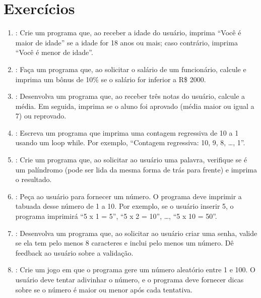\documentclass[letterpaper,10pt,english]{jupyterBook}
\begin{document}
\section{Exercícios}
\label{\detokenize{chapters/ch4/ch4:exercicios}}\begin{enumerate}
%
\item {} 
\sphinxAtStartPar
{}:
Crie um programa que, ao receber a idade do usuário, imprima “Você é maior de idade” se a idade for 18 anos ou mais; caso contrário, imprima “Você é menor de idade”.

\item {} 
\sphinxAtStartPar
{}:
Faça um programa que, ao solicitar o salário de um funcionário, calcule e imprima um bônus de 10\% se o salário for inferior a R\$ 2000.

\item {} 
\sphinxAtStartPar
{}:
Desenvolva um programa que, ao receber três notas do usuário, calcule a média. Em seguida, imprima se o aluno foi aprovado (média maior ou igual a 7) ou reprovado.

\item {} 
\sphinxAtStartPar
{}:
Escreva um programa que imprima uma contagem regressiva de 10 a 1 usando um loop while. Por exemplo, “Contagem regressiva: 10, 9, 8, …, 1”.

\item {} 
\sphinxAtStartPar
{}:
Crie um programa que, ao solicitar ao usuário uma palavra, verifique se é um palíndromo (pode ser lida da mesma forma de trás para frente) e imprima o resultado.

\item {} 
\sphinxAtStartPar
{}:
Peça ao usuário para fornecer um número. O programa deve imprimir a tabuada desse número de 1 a 10. Por exemplo, se o usuário inserir 5, o programa imprimirá “5 x 1 = 5”, “5 x 2 = 10”, …, “5 x 10 = 50”.

\item {} 
\sphinxAtStartPar
{}:
Desenvolva um programa que, ao solicitar ao usuário criar uma senha, valide se ela tem pelo menos 8 caracteres e inclui pelo menos um número. Dê feedback ao usuário sobre a validação.

\item {} 
\sphinxAtStartPar
{}:
Crie um jogo em que o programa gere um número aleatório entre 1 e 100. O usuário deve tentar adivinhar o número, e o programa deve fornecer dicas sobre se o número é maior ou menor após cada tentativa.


\end{enumerate}
\end{document}
